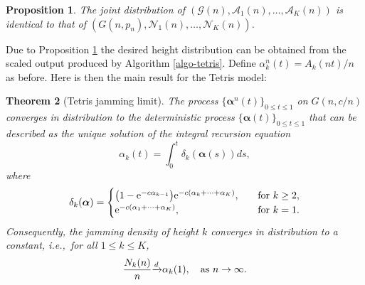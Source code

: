 \documentclass[11pt,a4paper, reqno]{article}
\newtheorem{theorem}{Theorem}
\newtheorem{proposition}[theorem]{Proposition}
\begin{document}
\begin{proposition}\label{prop:tetris}
The joint distribution of  $(\mathcal{G}(n),\mathcal{A}_1(n),\ldots,\mathcal{A}_K(n))$ is identical to that of $(G(n,p_n), \mathcal{N}_1(n),\ldots, \mathcal{N}_K(n))$.
\end{proposition}
Due to Proposition \ref{prop:tetris} the desired height distribution can be obtained from  the scaled output produced by Algorithm \ref{algo-tetris}.
Define $\alpha_k^n(t)=A_k(nt)/n$ as before. Here is then the main result for the Tetris model:
\begin{theorem}[Tetris jamming limit]\label{th:tetris}
The process $\{{\ensuremath{\boldsymbol{{\alpha}}}}^n(t)\}_{0\leq t\leq1}$ on $G(n,c/n)$ converges in distribution  to the deterministic process $\{{\ensuremath{\boldsymbol{{\alpha}}}}(t)\}_{0\leq t\leq 1}$ that can be described as the unique solution of the integral recursion equation
\begin{equation}\label{eq:alpha-tetris}
 \alpha_k(t)=\int_0^t\delta_k({\ensuremath{\boldsymbol{{\alpha}}}}(s))ds,
\end{equation} where
\begin{equation}\label{def:delta-tetris}
 \delta_k({\ensuremath{\boldsymbol{{\alpha}}}})=\begin{cases} \big( 1-{\ensuremath{\mathrm{e}}}^{-c\alpha_{k-1}}\big){\ensuremath{\mathrm{e}}}^{-c(\alpha_k+\dots+\alpha_{{\scriptscriptstyle} K})}, \quad &\mathrm{for }\ k\geq 2,\\
 {\ensuremath{\mathrm{e}}}^{-c(\alpha_1+\dots+\alpha_K)}, &\mathrm{for }\ k=1.
 \end{cases}
\end{equation}
Consequently, the jamming density of height $k$ converges in distribution to a constant, i.e.,~for all $1\leq k\leq K$,
\begin{equation}
\frac{N_k(n)}{n}{\ensuremath{\xrightarrow{d}}} \alpha_k(1), \quad {\rm as} \  n\to\infty.
\end{equation}
\end{theorem}
\end{document}
